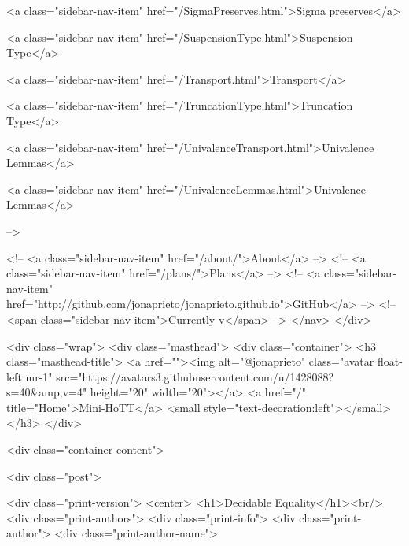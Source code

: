       
        
          <a class="sidebar-nav-item" href="/SigmaPreserves.html">Sigma preserves</a>
        
      
    
      
        
          <a class="sidebar-nav-item" href="/SuspensionType.html">Suspension Type</a>
        
      
    
      
        
          <a class="sidebar-nav-item" href="/Transport.html">Transport</a>
        
      
    
      
        
          <a class="sidebar-nav-item" href="/TruncationType.html">Truncation Type</a>
        
      
    
      
        
          <a class="sidebar-nav-item" href="/UnivalenceTransport.html">Univalence Lemmas</a>
        
      
    
      
        
          <a class="sidebar-nav-item" href="/UnivalenceLemmas.html">Univalence Lemmas</a>
        
      
     -->

    <!-- <a class="sidebar-nav-item" href="/about/">About</a> -->
    <!-- <a class="sidebar-nav-item" href="/plans/">Plans</a> -->
    <!-- <a class="sidebar-nav-item" href="http://github.com/jonaprieto/jonaprieto.github.io">GitHub</a> -->
    <!-- <span class="sidebar-nav-item">Currently v</span> -->
  </nav>
</div>

    <div class="wrap">
      <div class="masthead">
        <div class="container">
          <h3 class="masthead-title">
            <a href=""><img alt="@jonaprieto" class="avatar float-left mr-1" src="https://avatars3.githubusercontent.com/u/1428088?s=40&amp;v=4" height="20" width="20"></a>
            <a href="/" title="Home">Mini-HoTT</a>
            <small style="text-decoration:left"></small>
          </h3>
        </div>
      
      <div class="container content">
        







<div class="post">

  <div class="print-version">
    <center>
      <h1>Decidable Equality</h1><br/>
        <div class="print-authors">
          <div class="print-info">
            <div class="print-author">
              <div class="print-author-name">
                
